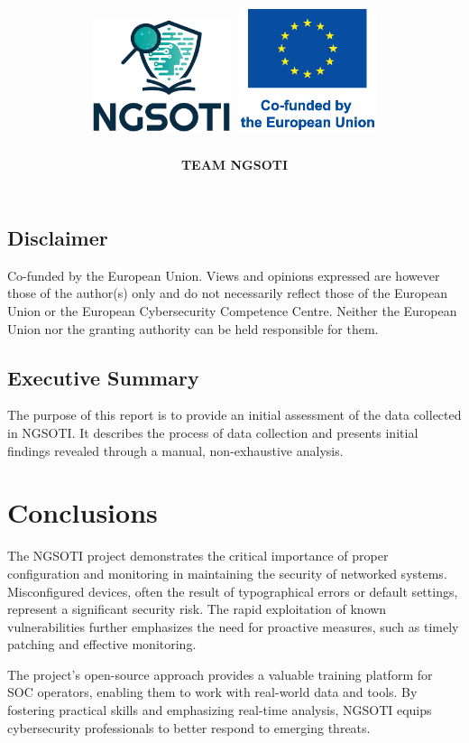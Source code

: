 \documentclass[10pt,a4paper]{report}
\title{
    \Huge \textbf{\delivtitle} \\[0.5cm]
    \includegraphics[width=0.3\textwidth]{img/ngsoti.eps}
    \hspace{1cm}
    \includegraphics[width=0.3\textwidth]{img/eu_funded_en.eps}
}
\author{\textbf{TEAM NGSOTI}}
\date{\delivdate}
\begin{document}
\maketitle
\thispagestyle{empty} %

\newpage
\tableofcontents
\newpage
\section*{Disclaimer}
Co-funded by the European Union. Views and opinions expressed are however those of the author(s) only
and do not necessarily reflect those of the European Union or the European Cybersecurity Competence Centre. Neither
the European Union nor the granting authority can be held responsible for them.
\section*{Executive Summary}
The purpose of this report is to provide an initial assessment of the data
collected in NGSOTI. It describes the process of data collection and presents
initial findings revealed through a manual, non-exhaustive analysis.




\chapter{Conclusions}
The NGSOTI project demonstrates the critical importance of proper configuration and monitoring in maintaining the security of networked systems. Misconfigured devices, often the result of typographical errors or default settings, represent a significant security risk. The rapid exploitation of known vulnerabilities further emphasizes the need for proactive measures, such as timely patching and effective monitoring.

The project's open-source approach provides a valuable training platform for SOC operators, enabling them to work with real-world data and tools. By fostering practical skills and emphasizing real-time analysis, NGSOTI equips cybersecurity professionals to better respond to emerging threats.


\end{document}
